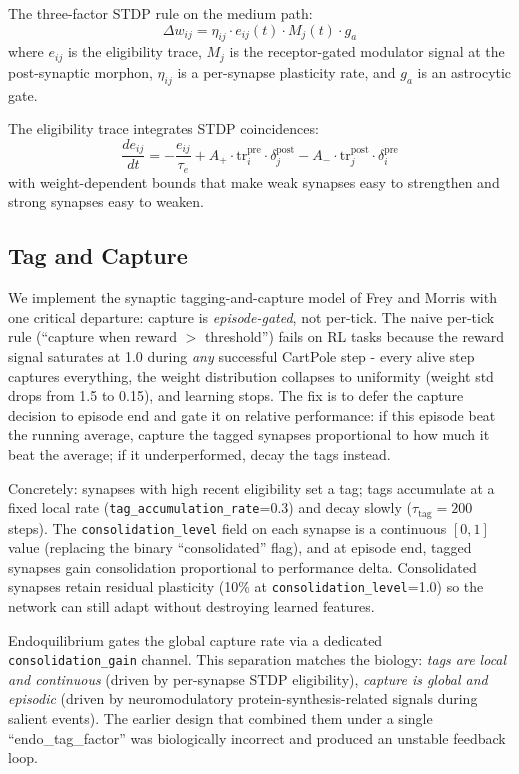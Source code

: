 The three-factor STDP rule on the medium path:
\begin{equation}
\Delta w_{ij} = \eta_{ij} \cdot e_{ij}(t) \cdot M_j(t) \cdot g_a
\end{equation}
where $e_{ij}$ is the eligibility trace, $M_j$ is the receptor-gated modulator signal at the post-synaptic morphon, $\eta_{ij}$ is a per-synapse plasticity rate, and $g_a$ is an astrocytic gate.

The eligibility trace integrates STDP coincidences:
\begin{equation}
\frac{de_{ij}}{dt} = -\frac{e_{ij}}{\tau_e} + A_+ \cdot \text{tr}_i^{\text{pre}} \cdot \delta_j^{\text{post}} - A_- \cdot \text{tr}_j^{\text{post}} \cdot \delta_i^{\text{pre}}
\end{equation}
with weight-dependent bounds \cite{gilson2011stability} that make weak synapses easy to strengthen and strong synapses easy to weaken.

\subsection{Tag and Capture}

We implement the synaptic tagging-and-capture model of Frey and Morris \cite{frey1997synaptic} with one critical departure: capture is \emph{episode-gated}, not per-tick. The naive per-tick rule (``capture when reward $>$ threshold'') fails on RL tasks because the reward signal saturates at 1.0 during \emph{any} successful CartPole step - every alive step captures everything, the weight distribution collapses to uniformity (weight std drops from 1.5 to 0.15), and learning stops. The fix is to defer the capture decision to episode end and gate it on relative performance: if this episode beat the running average, capture the tagged synapses proportional to how much it beat the average; if it underperformed, decay the tags instead.

Concretely: synapses with high recent eligibility set a tag; tags accumulate at a fixed local rate (\texttt{tag\_accumulation\_rate}=0.3) and decay slowly ($\tau_{\text{tag}}=200$ steps). The \texttt{consolidation\_level} field on each synapse is a continuous $[0, 1]$ value (replacing the binary ``consolidated'' flag), and at episode end, tagged synapses gain consolidation proportional to performance delta. Consolidated synapses retain residual plasticity (10\% at \texttt{consolidation\_level}=1.0) so the network can still adapt without destroying learned features.

Endoquilibrium gates the global capture rate via a dedicated \texttt{consolidation\_gain} channel. This separation matches the biology: \emph{tags are local and continuous} (driven by per-synapse STDP eligibility), \emph{capture is global and episodic} (driven by neuromodulatory protein-synthesis-related signals during salient events). The earlier design that combined them under a single ``endo\_tag\_factor'' was biologically incorrect and produced an unstable feedback loop.

